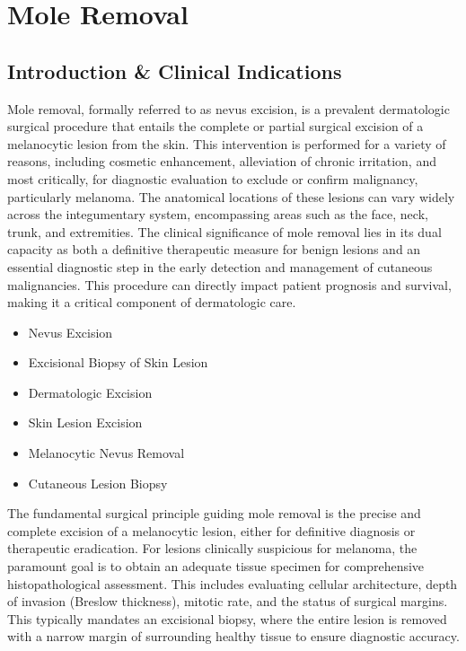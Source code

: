 \chapter{Mole Removal}

\section*{Introduction \& Clinical Indications}
Mole removal, formally referred to as nevus excision, is a prevalent dermatologic surgical procedure that entails the complete or partial surgical excision of a melanocytic lesion from the skin. This intervention is performed for a variety of reasons, including cosmetic enhancement, alleviation of chronic irritation, and most critically, for diagnostic evaluation to exclude or confirm malignancy, particularly melanoma. The anatomical locations of these lesions can vary widely across the integumentary system, encompassing areas such as the face, neck, trunk, and extremities. The clinical significance of mole removal lies in its dual capacity as both a definitive therapeutic measure for benign lesions and an essential diagnostic step in the early detection and management of cutaneous malignancies. This procedure can directly impact patient prognosis and survival, making it a critical component of dermatologic care.

\begin{itemize}
  \item Nevus Excision
  \item Excisional Biopsy of Skin Lesion
  \item Dermatologic Excision
  \item Skin Lesion Excision
  \item Melanocytic Nevus Removal
  \item Cutaneous Lesion Biopsy
\end{itemize}

The fundamental surgical principle guiding mole removal is the precise and complete excision of a melanocytic lesion, either for definitive diagnosis or therapeutic eradication. For lesions clinically suspicious for melanoma, the paramount goal is to obtain an adequate tissue specimen for comprehensive histopathological assessment. This includes evaluating cellular architecture, depth of invasion (Breslow thickness), mitotic rate, and the status of surgical margins. This typically mandates an excisional biopsy, where the entire lesion is removed with a narrow margin of surrounding healthy tissue to ensure diagnostic accuracy.

